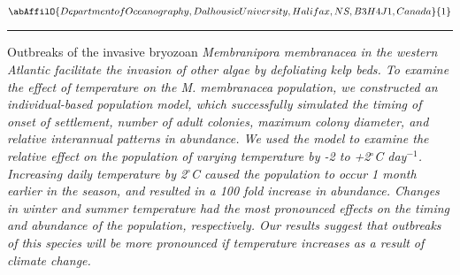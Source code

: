 \begin{minipage}{\linewidth}\begin{center}\begin{minipage}{\linewidth}
   \vspace{2 mm} \begin{center}
    \vspace{2 mm}\begin{center}
  
  $\abAffilO{Department of Oceanography, Dalhousie University, Halifax, NS, B3H 4J1, Canada}{1}$

  \end{center}
  \vspace{2 mm}
  \end{center}\end{minipage}\end{center}
  \begin{center}\rule{0.70\linewidth}{0.5 pt}\end{center}
  \begin{minipage}{\linewidth}
\noindent Outbreaks of the invasive bryozoan \sl Membranipora membranacea \rm in the western Atlantic facilitate the invasion of other algae by defoliating kelp beds. To examine the effect of temperature on the \sl M. membranacea \rm population, we constructed an individual-based population model, which successfully simulated the timing of onset of settlement, number of adult colonies, maximum colony diameter, and relative interannual patterns in abundance. We used the model to examine the relative effect on the population of varying temperature by -2 to +2$^{\circ}$C day$^{-1}$. Increasing daily temperature by 2$^{\circ}$C caused the population to occur 1 month earlier in the season, and resulted in a 100 fold increase in abundance. Changes in winter and summer temperature had the most pronounced effects on the timing and abundance of the population, respectively. Our results suggest that outbreaks of this species will be more pronounced if temperature increases as a result of climate change. 
\end{minipage}\end{minipage}
